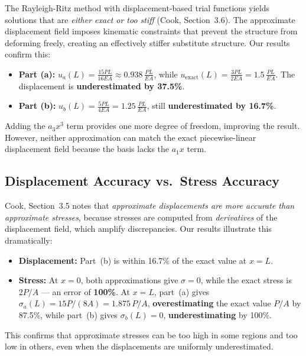 \documentclass[11pt, a4paper]{article}
\begin{document}
The Rayleigh-Ritz method with displacement-based trial functions yields solutions that are \textit{either exact or too stiff} (Cook, Section~3.6).  The approximate displacement field imposes kinematic constraints that prevent the structure from deforming freely, creating an effectively stiffer substitute structure.  Our results confirm this:

\begin{itemize}
    \item \textbf{Part (a):}\; $u_a(L) = \frac{15PL}{16EA} \approx 0.938\,\frac{PL}{EA}$, while $u_{\text{exact}}(L) = \frac{3PL}{2EA} = 1.5\,\frac{PL}{EA}$.  The displacement is \textbf{underestimated by 37.5\%}.
    \item \textbf{Part (b):}\; $u_b(L) = \frac{5PL}{4EA} = 1.25\,\frac{PL}{EA}$, still \textbf{underestimated by 16.7\%}.
\end{itemize}

Adding the $a_3 x^3$ term provides one more degree of freedom, improving the result.  However, neither approximation can match the exact piecewise-linear displacement field because the basis lacks the $a_1 x$ term.

\subsection{Displacement Accuracy vs.\ Stress Accuracy}

Cook, Section~3.5 notes that \textit{approximate displacements are more accurate than approximate stresses}, because stresses are computed from \textit{derivatives} of the displacement field, which amplify discrepancies.  Our results illustrate this dramatically:

\begin{itemize}
    \item \textbf{Displacement:}\; Part~(b) is within 16.7\% of the exact value at $x = L$.
    \item \textbf{Stress:}\; At $x = 0$, both approximations give $\sigma = 0$, while the exact stress is $2P/A$ --- an error of \textbf{100\%}.  At $x = L$, part~(a) gives $\sigma_a(L) = 15P/(8A) = 1.875\,P/A$, \textbf{overestimating} the exact value $P/A$ by 87.5\%, while part~(b) gives $\sigma_b(L) = 0$, \textbf{underestimating} by 100\%.
\end{itemize}

This confirms that approximate stresses can be too high in some regions and too low in others, even when the displacements are uniformly underestimated.
\end{document}
